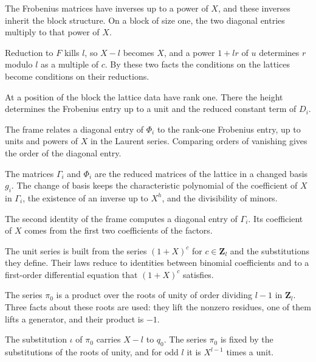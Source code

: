 The Frobenius matrices have inverses up to a power of $X$, and these inverses inherit the block
structure. On a block of size one, the two diagonal entries multiply to that power of $X$.

Reduction to $F$ kills $l$, so $X-l$ becomes $X$, and a power $1+lr$ of $u$ determines $r$ modulo $l$ as
a multiple of $c$. By these two facts the conditions on the lattices become conditions on their
reductions.

At a position of the block the lattice data have rank one. There the height determines the Frobenius
entry up to a unit and the reduced constant term of $D_i$.

The frame relates a diagonal entry of $\Phi_i$ to the rank-one Frobenius entry, up to units and powers
of $X$ in the Laurent series. Comparing orders of vanishing gives the order of the diagonal entry.

The matrices $\Gamma_i$ and $\Phi_i$ are the reduced matrices of the lattice in a changed basis $g_i$.
The change of basis keeps the characteristic polynomial of the coefficient of $X$ in $\Gamma_i$, the
existence of an inverse up to $X^h$, and the divisibility of minors.

The second identity of the frame computes a diagonal entry of $\Gamma_i$. Its coefficient of $X$ comes
from the first two coefficients of the factors.

The unit series is built from the series $(1+X)^c$ for $c\in\mathbf Z_l$ and the substitutions they
define. Their laws reduce to identities between binomial coefficients and to a first-order differential
equation that $(1+X)^c$ satisfies.

The series $\pi_0$ is a product over the roots of unity of order dividing $l-1$ in $\mathbf Z_l$. Three
facts about these roots are used: they lift the nonzero residues, one of them lifts a generator, and
their product is $-1$.

The substitution $\iota$ of $\pi_0$ carries $X-l$ to $q_0$. The series $\pi_0$ is fixed by the
substitutions of the roots of unity, and for odd $l$ it is $X^{l-1}$ times a unit.

